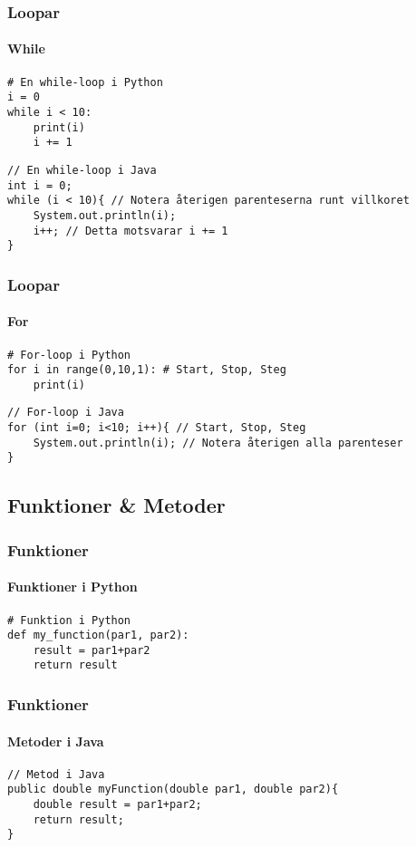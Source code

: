 \documentclass[aspectratio=169]{beamer}
\begin{document}
\begin{frame}[fragile]
    \frametitle{Loopar}
    \framesubtitle{While}

    \begin{lstlisting}[style=python]
# En while-loop i Python
i = 0
while i < 10:
    print(i)
    i += 1
    \end{lstlisting}

    \begin{lstlisting}[style=java]
// En while-loop i Java
int i = 0;
while (i < 10){ // Notera återigen parenteserna runt villkoret
    System.out.println(i);
    i++; // Detta motsvarar i += 1
}
    \end{lstlisting}

\end{frame}

\begin{frame}[fragile]
    \frametitle{Loopar}
    \framesubtitle{For}

    \begin{lstlisting}[style=python]
# For-loop i Python
for i in range(0,10,1): # Start, Stop, Steg
    print(i)
    \end{lstlisting}

    \begin{lstlisting}[style=java]
// For-loop i Java
for (int i=0; i<10; i++){ // Start, Stop, Steg
    System.out.println(i); // Notera återigen alla parenteser
}
    \end{lstlisting}

\end{frame}

\subsection{Funktioner \& Metoder}

\begin{frame}[fragile]
    \frametitle{Funktioner}
    \framesubtitle{Funktioner i Python}

    \begin{lstlisting}[style=python]
# Funktion i Python
def my_function(par1, par2):
    result = par1+par2
    return result
    \end{lstlisting}

\end{frame}

\begin{frame}[fragile]
    \frametitle{Funktioner}
    \framesubtitle{Metoder i Java}



    \begin{lstlisting}[style=java]
// Metod i Java
public double myFunction(double par1, double par2){
    double result = par1+par2;
    return result;
}
    \end{lstlisting}

\end{frame}
\end{document}
